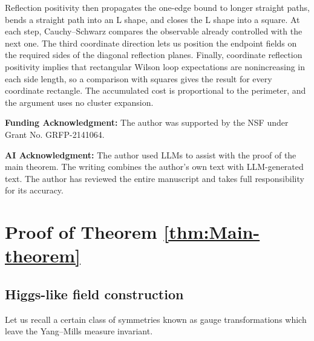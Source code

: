 \documentclass[reqno]{amsart}
\begin{document}
Reflection positivity then propagates the one-edge bound to longer
straight paths, bends a straight path into an L shape, and closes the
L shape into a square. At each step, Cauchy--Schwarz compares the
observable already controlled with the next one. The third coordinate
direction lets us position the endpoint fields on the required sides
of the diagonal reflection planes. Finally, coordinate reflection
positivity implies that rectangular Wilson loop expectations are
nonincreasing in each side length, so a comparison with squares gives
the result for every coordinate rectangle. The accumulated cost is
proportional to the perimeter, and the argument uses no cluster
expansion.

\noindent \textbf{Funding Acknowledgment:} The author was supported by the NSF under Grant No. GRFP-2141064.

\noindent \textbf{AI Acknowledgment:} The author used LLMs to assist with the proof of the main theorem. The writing combines the author's own text with LLM-generated text. The author has reviewed the entire manuscript and takes full responsibility for its accuracy.

\section{Proof of Theorem \ref{thm:Main-theorem}}\label{Section:Proof-of-main-thm}

\subsection{Higgs-like field construction}\label{sec:field-construction}

 Let us recall a certain class of symmetries known as gauge transformations which leave the Yang--Mills measure invariant.
\end{document}
